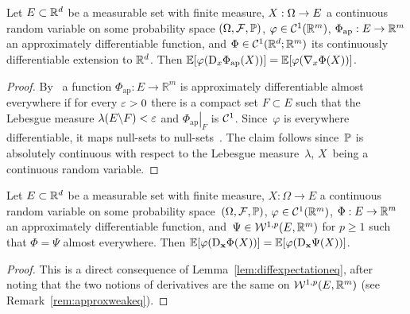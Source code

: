 \begin{lemma}\label{lem:diffexpectationeq}
Let $E\subset \mathbb{R}^d$ be a measurable set with finite measure, $X:\Omega\rightarrow\nobreak E$ a continuous random variable on some probability space $(\Omega, \mathcal{F}, \mathbb{P})$,
$\varphi\in\mathcal{C}^1(\mathbb{R}^m)$, $\Phi_{\mathrm{ap}}: E\rightarrow \mathbb{R}^m$ an approximately differentiable function, and $\Phi\in\mathcal{C}^1(\mathbb{R}^d; \mathbb{R}^m)$
its continuously differentiable extension to $\mathbb{R}^d$.
Then
$\mathbb{E}[\varphi(\mathrm{D}_{x}\Phi_{\mathrm{ap}}(X))] = \mathbb{E}[\varphi(\nabla_x\Phi(X))]
$.

\end{lemma}
\begin{proof}
By~\cite[Theorem 3.1.6]{Federer1996GeometricTheory} a function $\Phi_{\mathrm{ap}}: E \rightarrow \mathbb{R}^{m}$ is approximately differentiable almost everywhere if for every $\varepsilon>0$ there is a compact set $F \subset E$ such that the Lebesgue measure $\lambda(E \backslash F)<\varepsilon$ and $\left.\Phi_{\mathrm{ap}}\right|_{F}$ is $\mathcal{C}^{1}$. 
Since~$\varphi$ is everywhere differentiable, 
it maps null-sets to null-sets~\cite[Lemma 7.25]{Rudin1986RealAnalysis}. 
The claim follows since~$\mathbb{P}$ is absolutely continuous with respect to the Lebesgue measure~$\lambda$, $X$~being a continuous random variable.

\end{proof}
\begin{corollary}\label{coro:diffexpectationeq2}
    Let $E\subset \mathbb{R}^d$ be a measurable set with finite measure, ${X:\Omega\rightarrow E}$ a continuous random variable on some probability space~$(\Omega, \mathcal{F}, \mathbb{P})$, $\varphi\in\mathcal{C}^1(\mathbb{R}^m)$, $\Phi:E\rightarrow \mathbb{R}^m$ an approximately differentiable function, and~${\Psi\in\mathcal{W}^{1,p}(E,\mathbb{R}^m)}$
    for $p\geq 1$ such that $\Phi = \Psi$ almost everywhere. Then
    $\mathbb{E}[\varphi(\mathrm{D}_{\boldsymbol{\mathrm{x}}}\Phi(X))] = \mathbb{E}[\varphi(\mathrm{D}_{\boldsymbol{\mathrm{x}}}\Psi(X))]$.
\end{corollary}
\begin{proof}
This is a direct consequence of Lemma~\ref{lem:diffexpectationeq}, after noting that the two notions of derivatives are the same on $\mathcal{W}^{1,p}(E,\mathbb{R}^m)$ (see Remark~\ref{rem:approxweakeq}).
\end{proof}

